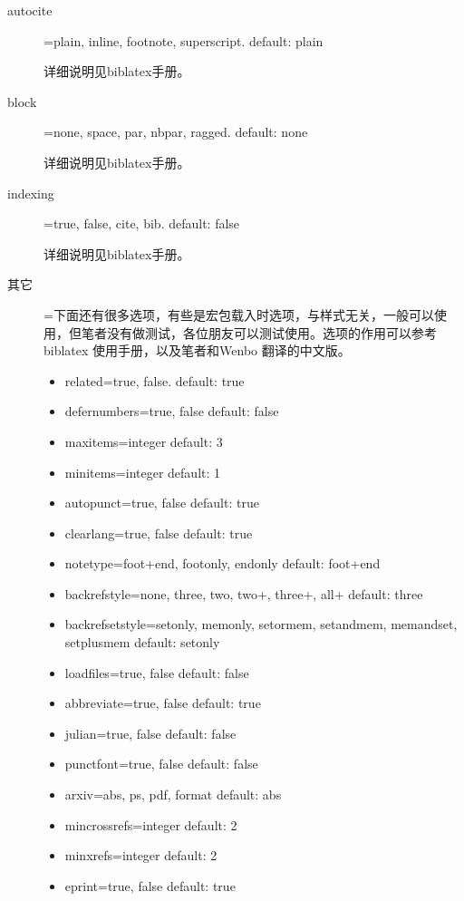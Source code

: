 \begin{description}
  \item[autocite]=plain, inline, footnote, superscript. \hfill default: plain

  详细说明见biblatex手册。

  \item[block]=none, space, par, nbpar, ragged. \hfill default: none

  详细说明见biblatex手册。

  \item[indexing]=true, false, cite, bib. \hfill default: false

  详细说明见biblatex手册。

  \item[其它]=下面还有很多选项，有些是宏包载入时选项，与样式无关，一般可以使用，但笔者没有做测试，各位朋友可以测试使用。选项的作用可以参考biblatex 使用手册，以及笔者和Wenbo 翻译的中文版。
      \begin{itemize}
          \item related=true, false. default: true
          \item defernumbers=true, false default: false
          \item maxitems=integer default: 3
          \item minitems=integer default: 1
          \item autopunct=true, false default: true
          \item clearlang=true, false default: true
          \item notetype=foot+end, footonly, endonly default: foot+end
          \item backrefstyle=none, three, two, two+, three+, all+ default: three
          \item backrefsetstyle=setonly, memonly, setormem, setandmem, memandset, setplusmem default: setonly
          \item loadfiles=true, false default: false
          \item abbreviate=true, false default: true
          \item julian=true, false default: false
          \item punctfont=true, false default: false
          \item arxiv=abs, ps, pdf, format default: abs
          \item mincrossrefs=integer default: 2
          \item minxrefs=integer default: 2
          \item eprint=true, false default: true
      \end{itemize}

\end{description}


